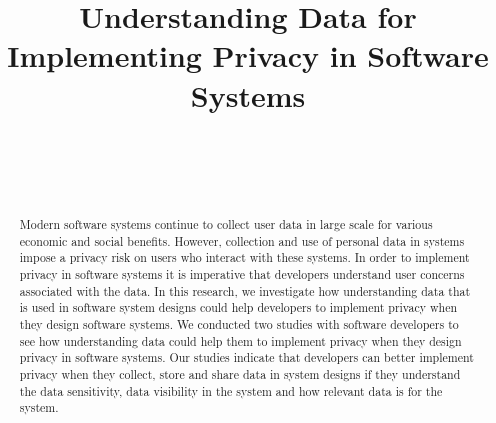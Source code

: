 \documentclass{sigchi}
\def\plaintitle{Understanding Data for Implementing Privacy in Software Systems}
\begin{document}
\title{\plaintitle}

\author{%
  \\
  \\
  \\
}

\maketitle

\begin{abstract}
Modern software systems continue to collect user data in large scale for various economic and social benefits. However, collection and use of personal data in systems impose a privacy risk on users who interact with these systems. In order to implement privacy in software systems it is imperative that developers understand user concerns associated with the data. In this research, we investigate how understanding data that is used in software system designs could help developers to implement privacy when they design software systems. We conducted two studies with software developers to see how understanding data could help them to implement privacy when they design privacy in software systems. Our studies indicate that developers can better implement privacy when they collect, store and share data in system designs if they understand the data sensitivity, data visibility in the system and how relevant data is for the system. 
\end{abstract}

 

\end{document}
